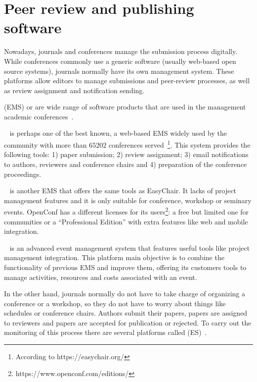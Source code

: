 \section{Peer review and publishing software}
\label{sec:state-art}

Nowadays, journals and conferences manage the submission process digitally.
While conferences commonly use a generic software (usually web-based open source
systems), journals normally have its own management system. These platforms
allow editors to manage submissions and peer-review processes, as well as review
assignment and notification sending.

 (EMS) or  are
wide range of software products that are used in the management academic
conferences~\cite{azar2006academic}.

~\cite{easychair} is perhaps one of the best known, a web-based
EMS widely used by the community with more than $65202$ conferences
served~\footnote{According to https://easychair.org/}. This system provides the
following tools: 1) paper submission; 2) review assignment; 3) email
notifications to authors, reviewers and conference chairs and 4) preparation of
the conference proceedings.

~\cite{openconf} is another EMS that offers the same tools as
EasyChair. It lacks of project management features and it is only suitable for
conference, workshop or seminary events. OpenConf has a different licenses for
its users\footnote{https://www.openconf.com/editions/}: a free but limited one
for communities or a ``Professional Edition'' with extra features like web and
mobile integration.

~\cite{paulo2011aems} is an advanced event management system that
features useful tools like project management integration. This platform main
objective is to combine the functionality of previous EMS and improve them,
offering its customers tools to manage activities, resources and costs
associated with an event.

In the other hand, journals normally do not have to take charge of organizing a
conference or a workshop, so they do not have to worry about things like
schedules or conference chairs. Authors submit their papers, papers are assigned
to reviewers and papers are accepted for publication or rejected. To carry out
the monitoring of this process there are several platforms called  (ES)~\cite{Lev2016}.


